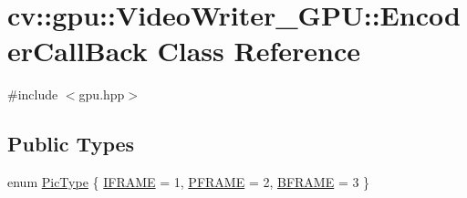 \hypertarget{classcv_1_1gpu_1_1VideoWriter__GPU_1_1EncoderCallBack}{\section{cv\-:\-:gpu\-:\-:Video\-Writer\-\_\-\-G\-P\-U\-:\-:Encoder\-Call\-Back Class Reference}
\label{classcv_1_1gpu_1_1VideoWriter__GPU_1_1EncoderCallBack}
}


{\ttfamily \#include $<$gpu.\-hpp$>$}

\subsection*{Public Types}
\begin{DoxyCompactItemize}
\item 
enum \hyperlink{classcv_1_1gpu_1_1VideoWriter__GPU_1_1EncoderCallBack_aa8c69464d7b00114cd7b058a2738be0e}{Pic\-Type} \{ \hyperlink{classcv_1_1gpu_1_1VideoWriter__GPU_1_1EncoderCallBack_aa8c69464d7b00114cd7b058a2738be0ead0da42fdb1d4fdeef7363a0b07b1994a}{I\-F\-R\-A\-M\-E} = 1, 
\hyperlink{classcv_1_1gpu_1_1VideoWriter__GPU_1_1EncoderCallBack_aa8c69464d7b00114cd7b058a2738be0ea8067620fa9d0cc29606b84f8e0df8987}{P\-F\-R\-A\-M\-E} = 2, 
\hyperlink{classcv_1_1gpu_1_1VideoWriter__GPU_1_1EncoderCallBack_aa8c69464d7b00114cd7b058a2738be0eab2f9cfe19797bcbc8c147100a8c147fd}{B\-F\-R\-A\-M\-E} = 3
 \}
\end{DoxyCompactItemize}
